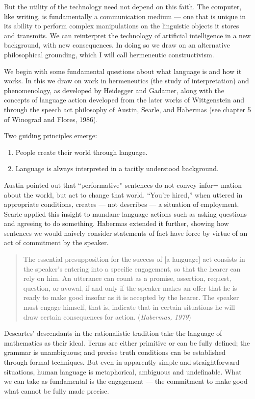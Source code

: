 \documentclass[12pt]{article}
\def\bq{\begin{quote}}
\def\eq{\end{quote}}
\begin{document}
But the utility of the technology need not depend on this faith. The computer, like writing, is fundamentally a communication medium --- one that is unique in its ability to perform complex manipulations on the linguistic objects it stores and transmits. We can reinterpret the technology of artificial intelligence in a new background, with new consequences. In doing so we draw on an alternative philosophical grounding, which I will call hermeneutic constructivism.

We begin with some fundamental questions about what language is and how it works. In this we draw on work in hermeneutics (the study of interpretation) and phenomenology, as developed by Heidegger and Gadamer, along with the concepts of language action developed from the later works of Wittgenstein and through the speech act philosophy of Austin, Searle, and Habermas (see chapter 5 of Winograd and Flores, 1986).

Two guiding principles emerge:

\begin{enumerate}
\item People create their world through language.
\item Language is always interpreted in a tacitly understood background.
\end{enumerate}

Austin pointed out that ``performative'' sentences do not convey infor¬ mation about the world, but act to change that world. ``You're hired,'' when uttered in appropriate conditions, creates --- not describes --- a situation of employment. Searle applied this insight to mundane language actions such as asking questions and agreeing to do something. Habermas extended it further, showing how sentences we would naively consider statements of fact have force by virtue of an act of commitment by the speaker.

\bq
The essential presupposition for the success of [a language] act consists in the speaker's entering into a specific engagement, so that the hearer can rely on him. An utterance can count as a promise, assertion, request, question, or avowal, if and only if the speaker makes an offer that he is ready to make good insofar as it is accepted by the hearer. The speaker must engage himself, that is, indicate that in certain situations he will draw certain consequences for action. ({\it Habermas, 1979})
\eq

Descartes' descendants in the rationalistic tradition take the language of mathematics as their ideal. Terms are either primitive or can be fully defined; the grammar is unambiguous; and precise truth conditions can be established through formal techniques. But even in apparently simple and straightforward situations, human language is metaphorical, ambiguous and undefinable. What we can take as fundamental is the engagement --- the commitment to make good what cannot be fully made precise.
\end{document}
